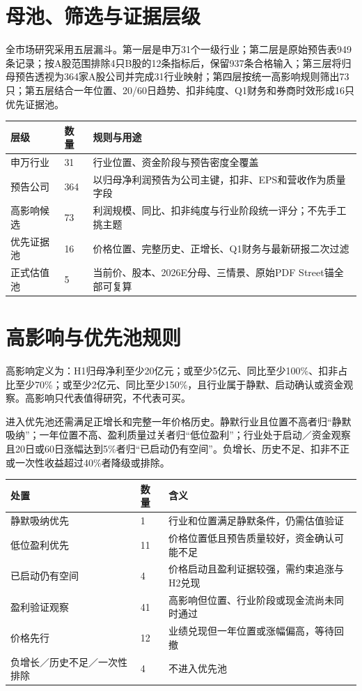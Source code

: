 \section{母池、筛选与证据层级}

全市场研究采用五层漏斗。第一层是申万31个一级行业；第二层是原始预告表949条记录；按A股范围排除4只B股的12条指标后，保留937条合格输入；第三层将归母预告透视为364家A股公司并完成31行业映射；第四层按统一高影响规则筛出73只；第五层结合一年位置、20/60日趋势、扣非纯度、Q1财务和券商时效形成16只优先证据池。

\begin{exhibitbox}
\begin{tabularx}{\textwidth}{L{2.2cm}R{1.5cm}X}
\toprule
\textbf{层级} & \textbf{数量} & \textbf{规则与用途} \\
\midrule
申万行业 & 31 & 行业位置、资金阶段与预告密度全覆盖 \\
预告公司 & 364 & 以归母净利润预告为公司主键，扣非、EPS和营收作为质量字段 \\
高影响候选 & 73 & 利润规模、同比、扣非纯度与行业阶段统一评分；不先手工挑主题 \\
优先证据池 & 16 & 价格位置、完整历史、正增长、Q1财务与最新研报二次过滤 \\
正式估值池 & 5 & 当前价、股本、2026E分母、三情景、原始PDF Street锚全部可复算 \\
\bottomrule
\end{tabularx}
\end{exhibitbox}

\section{高影响与优先池规则}

高影响定义为：H1归母净利至少20亿元；或至少5亿元、同比至少100\%、扣非占比至少70\%；或至少2亿元、同比至少150\%，且行业属于静默、启动确认或资金观察。高影响只代表值得研究，不代表可买。

进入优先池还需满足正增长和完整一年价格历史。静默行业且位置不高者归“静默吸纳”；一年位置不高、盈利质量过关者归“低位盈利”；行业处于启动／资金观察且20日或60日涨幅达到5\%者归“已启动仍有空间”。负增长、历史不足、扣非不正或一次性收益超过40\%者降级或排除。

\begin{exhibitbox}
\begin{tabularx}{\textwidth}{L{4.5cm}R{1.5cm}X}
\toprule
\textbf{处置} & \textbf{数量} & \textbf{含义} \\
\midrule
静默吸纳优先 & 1 & 行业和位置满足静默条件，仍需估值验证 \\
低位盈利优先 & 11 & 价格位置低且预告质量较好，资金确认可能不足 \\
已启动仍有空间 & 4 & 价格启动且盈利证据较强，需约束追涨与H2兑现 \\
盈利验证观察 & 41 & 高影响但位置、行业阶段或现金流尚未同时通过 \\
价格先行 & 12 & 业绩兑现但一年位置或涨幅偏高，等待回撤 \\
负增长／历史不足／一次性排除 & 4 & 不进入优先池 \\
\bottomrule
\end{tabularx}
\end{exhibitbox}

